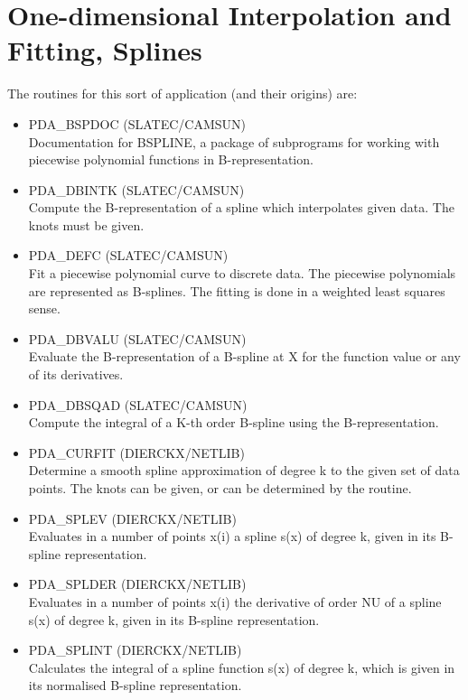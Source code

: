 \documentclass[11pt,twoside]{article}
\newcommand{\htmlref}[2]{#1}
\newcommand{\xlabel}[1]{}
\begin{document}

\section{\xlabel{one-dimensional_interpolation_and_fitting,_splines}One-dimensional
Interpolation and Fitting, Splines}

   The routines for this sort of application (and their origins) are:

\begin{itemize}

\item \htmlref{PDA\_BSPDOC}{PDA\_BSPDOC} (SLATEC/CAMSUN)\ \\
   Documentation for BSPLINE, a package of subprograms for working
   with piecewise polynomial functions in B-representation.
\item \htmlref{PDA\_DBINTK}{PDA\_DBINTK} (SLATEC/CAMSUN)\ \\
   Compute the B-representation of a spline which interpolates given
   data. The knots must be given.
\item \htmlref{PDA\_DEFC}{PDA\_DEFC} (SLATEC/CAMSUN)\ \\
   Fit a piecewise polynomial curve to discrete data. The piecewise
   polynomials are represented as B-splines. The fitting is done in a
   weighted least squares sense.
\item \htmlref{PDA\_DBVALU}{PDA\_DBVALU} (SLATEC/CAMSUN)\ \\
   Evaluate the B-representation of a B-spline at X for the function
   value or any of its derivatives.
\item \htmlref{PDA\_DBSQAD}{PDA\_DBSQAD} (SLATEC/CAMSUN)\ \\
   Compute the integral of a K-th order B-spline using the
   B-representation.

\item \htmlref{PDA\_CURFIT}{PDA\_CURFIT} (DIERCKX/NETLIB)\ \\
   Determine a smooth spline approximation of degree k to the given
   set of data points. The knots can be given, or can be determined
   by the routine.
\item \htmlref{PDA\_SPLEV}{PDA\_SPLEV} (DIERCKX/NETLIB)\ \\
   Evaluates in a number of points x(i) a spline s(x) of degree k,
   given in its B-spline representation.
\item \htmlref{PDA\_SPLDER}{PDA\_SPLDER} (DIERCKX/NETLIB)\ \\
   Evaluates in a number of points x(i) the derivative of order NU of
   a spline s(x) of degree k, given in its B-spline representation.
\item \htmlref{PDA\_SPLINT}{PDA\_SPLINT} (DIERCKX/NETLIB)\ \\
   Calculates the integral of a spline function s(x) of degree k,
   which is given in its normalised B-spline representation.


\end{itemize}
\end{document}
